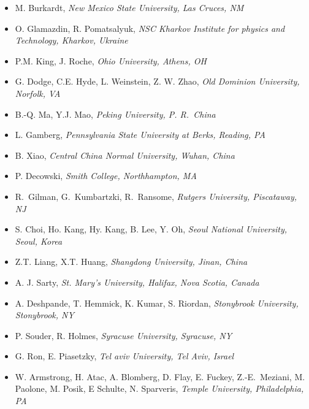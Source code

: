\begin{itemize}
 
\item M. Burkardt, 
\emph{New Mexico State University, Las Cruces, NM}
  
\item O. Glamazdin, R. Pomatsalyuk,
\emph{NSC Kharkov Institute for physics and Technology, Kharkov, Ukraine}
  
\item P.M. King, J. Roche,  
\emph{Ohio University, Athens, OH}  
 
\item G. Dodge, C.E. Hyde, L. Weinstein, Z. W. Zhao,
\emph{Old Dominion University, Norfolk, VA}  
  
\item B.-Q. Ma, Y.J. Mao, 
\emph{Peking University, P. R.~China}
 
\item L. Gamberg,  
\emph{Pennsylvania State University at Berks, Reading, PA}  
 
\item B. Xiao, 
\emph{Central China Normal University, Wuhan, China}  
  
\item P. Decowski,   
\emph{Smith College, Northhampton, MA}  
  
\item R.~Gilman, G.~Kumbartzki,
  R.~Ransome,  
\emph{Rutgers University, Piscataway, NJ}  
  
\item S. Choi, Ho. Kang, Hy. Kang, B. Lee, Y. Oh,
\emph{Seoul National University, Seoul, Korea}
  
\item Z.T. Liang, X.T. Huang, 
\emph{Shangdong University, Jinan, China}
  
\item A. J. Sarty, 
\emph{St. Mary's University, Halifax, Nova Scotia, Canada}
  
\item A. Deshpande, T. Hemmick, K. Kumar, S. Riordan,
\emph{Stonybrook University, Stonybrook, NY}
  
\item P. Souder, R. Holmes,    
\emph{Syracuse University, Syracuse, NY}
  
\item G. Ron, E. Piasetzky, 
\emph{Tel aviv University, Tel Aviv, Israel}
  
\item W. Armstrong, H. Atac, A. Blomberg, D. Flay, E. Fuckey, Z.-E.~Meziani,
  M. Paolone, M. Posik, E Schulte, N. Sparveris, 
\emph{Temple University, Philadelphia, PA}
  

\end{itemize}
